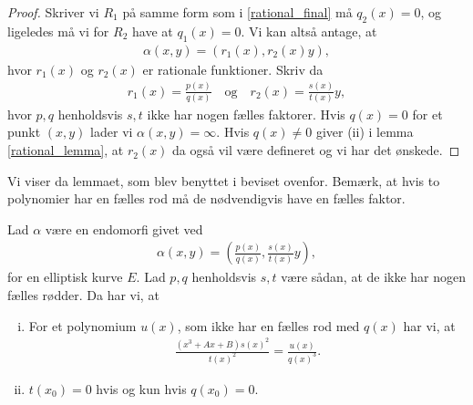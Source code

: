 \begin{proof}
Skriver vi $R_1$ på samme form som i \eqref{rational_final} må $q_2(x) = 0$, og ligeledes må vi for $R_2$ have at $q_1(x) = 0$. Vi kan altså antage, at
\begin{align*}
		\alpha(x, y) = (r_1(x), r_2(x)y),
\end{align*}
hvor $r_1(x)$ og $r_2(x)$ er rationale funktioner. Skriv da
\begin{align*}
	r_1(x) = \frac{p(x)}{q(x)} \quad \text{og} \quad r_2(x)=\frac{s(x)}{t(x)}y,
\end{align*}
hvor $p, q$ henholdsvis $s, t$ ikke har nogen fælles faktorer. Hvis $q(x)=0$ for et punkt $(x, y)$ lader vi 
$\alpha(x, y) = \infty$. Hvis $q(x) \neq 0$ giver (ii) i lemma \ref{rational_lemma}, at $r_2(x)$ da også vil være defineret og vi har det ønskede.
\end{proof}
Vi viser da lemmaet, som blev benyttet i beviset ovenfor. Bemærk, at hvis to polynomier har en fælles rod må de nødvendigvis have en fælles faktor.
\begin{lemma}
\label{rational_lemma}
Lad $\alpha$ være en endomorfi givet ved
\begin{align*}
	\alpha(x, y) = \left( \frac{p(x)}{q(x)}, \frac{s(x)}{t(x)}y \right),
\end{align*}
for en elliptisk kurve $E$. Lad $p, q$ henholdsvis $s, t$ være sådan, at de ikke har nogen fælles rødder. Da har vi, at
\begin{enumerate}[(i)]
	\item For et polynomium $u(x)$, som ikke har en fælles rod med $q(x)$ har vi, at
	\begin{align*}
		\frac{(x^3+Ax+B)s(x)^2}{t(x)^2} = \frac{u(x)}{q(x)^3}.
	\end{align*}
	\item $t(x_0)=0$ hvis og kun hvis $q(x_0)=0$.
\end{enumerate}
\end{lemma}
